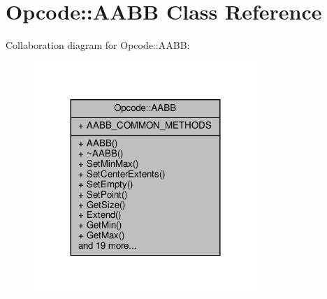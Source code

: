 \hypertarget{classOpcode_1_1AABB}{}\section{Opcode\+:\+:A\+A\+BB Class Reference}
\label{classOpcode_1_1AABB}


Collaboration diagram for Opcode\+:\+:A\+A\+BB\+:
\nopagebreak
\begin{figure}[H]
\begin{center}
\leavevmode
\includegraphics[width=240pt]{d2/df1/classOpcode_1_1AABB__coll__graph}
\end{center}
\end{figure}
